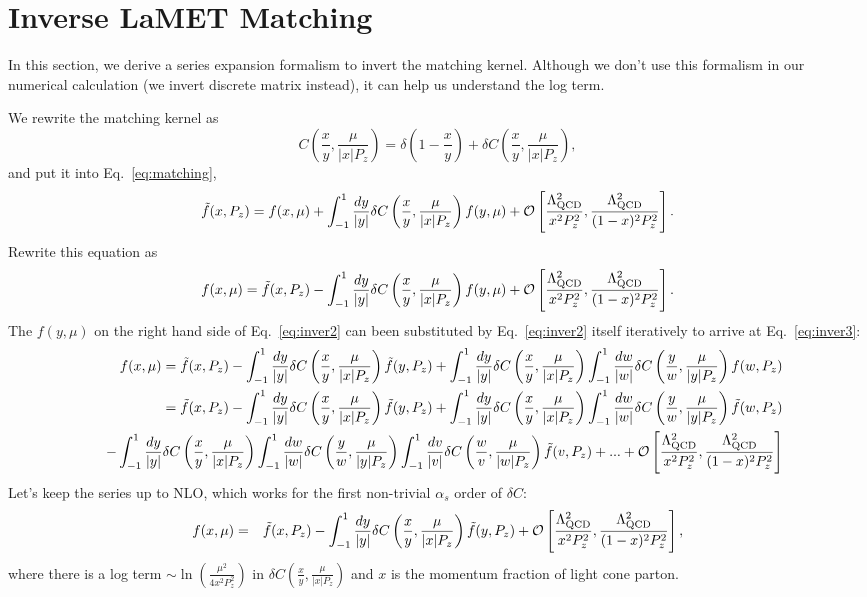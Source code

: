 \documentclass[prd,aps,twocolumn,preprintnumbers, showpacs, nofootinbib,superscriptaddress,notitlepage]{revtex4-2}
\def\bea{\begin{eqnarray}}
\def\eea{\end{eqnarray}}
\begin{document}
\section{Inverse LaMET Matching}\label{app:inversematching}

In this section, we derive a series expansion formalism to invert the matching kernel. Although we don't use this formalism in our numerical calculation (we invert discrete matrix instead), it can help us understand the log term. 

We rewrite the matching kernel as 
$$
C\left(\frac{x}{y},\frac{\mu}{|x|P_{z}}\right)=\delta\left(1-\frac{x}{y}\right) + \delta C\left(\frac{x}{y},\frac{\mu}{|x|P_{z}}\right),
$$ 
and put it into Eq.~\eqref{eq:matching},
\bea
\tilde{f}(x, P_{z}) = f(x, \mu) + \int_{-1}^{1} \frac{dy}{\left| y \right|} \delta C\left(\frac{x}{y},\frac{\mu}{|x|P_{z}}\right) f(y, \mu) + {\cal O}\left[\frac{\Lambda_{\rm QCD}^2}{x^2 P_{z}^2}, \frac{\Lambda_{\rm QCD}^2}{(1-x)^2 P_{z}^2}\right].
\eea
Rewrite this equation as
\bea\label{eq:inver2}
f(x, \mu) = \tilde{f}(x, P_{z}) - \int_{-1}^{1} \frac{dy}{\left| y \right|} \delta C\left(\frac{x}{y},\frac{\mu}{|x|P_{z}}\right) f(y, \mu) + {\cal O}\left[\frac{\Lambda_{\rm QCD}^2}{x^2 P_{z}^2}, \frac{\Lambda_{\rm QCD}^2}{(1-x)^2 P_{z}^2}\right].
\eea
The $f(y, \mu)$ on the right hand side of Eq.~\eqref{eq:inver2} can been substituted by Eq.~\eqref{eq:inver2} itself iteratively to arrive at Eq.~\eqref{eq:inver3}:
\bea\label{eq:inver3}
&&f(x, \mu) = \tilde{f}(x, P_{z}) - \int_{-1}^{1} \frac{dy}{\left| y \right|} \delta C\left(\frac{x}{y},\frac{\mu}{|x|P_{z}}\right) \tilde{f}(y, P_{z}) 
+ \int_{-1}^{1} \frac{dy}{\left| y \right|} \delta C\left(\frac{x}{y},\frac{\mu}{|x|P_{z}}\right) \int_{-1}^{1} \frac{dw}{\left| w \right|} \delta C\left(\frac{y}{w},\frac{\mu}{|y|P_{z}}\right) f(w, P_{z}) \nonumber\\
&&= \tilde{f}(x, P_{z}) - \int_{-1}^{1} \frac{dy}{\left| y \right|} \delta C\left(\frac{x}{y},\frac{\mu}{|x|P_{z}}\right) \tilde{f}(y, P_{z}) 
+ \int_{-1}^{1} \frac{dy}{\left| y \right|} \delta C\left(\frac{x}{y},\frac{\mu}{|x|P_{z}}\right) \int_{-1}^{1} \frac{dw}{\left| w \right|} \delta C\left(\frac{y}{w},\frac{\mu}{|y|P_{z}}\right) \tilde{f}(w, P_{z}) \nonumber\\
&&-\int_{-1}^{1} \frac{dy}{\left| y \right|} \delta C\left(\frac{x}{y},\frac{\mu}{|x|P_{z}}\right) \int_{-1}^{1} \frac{dw}{\left| w \right|} \delta C\left(\frac{y}{w},\frac{\mu}{|y|P_{z}}\right) \int_{-1}^{1} \frac{dv}{\left| v \right|} \delta C\left(\frac{w}{v},\frac{\mu}{|w|P_{z}}\right) \tilde{f}(v, P_{z}) + ... + {\cal O}\left[\frac{\Lambda_{\rm QCD}^2}{x^2 P_{z}^2}, \frac{\Lambda_{\rm QCD}^2}{(1-x)^2 P_{z}^2}\right]
\eea
Let's keep the series up to NLO, which works for the first non-trivial $\alpha_s$ order of $\delta C$:
\bea
f(x, \mu) 
=&& \tilde{f}(x, P_{z}) - \int_{-1}^{1} \frac{dy}{\left| y \right|} \delta C\left(\frac{x}{y},\frac{\mu}{|x|P_{z}}\right) \tilde{f}(y, P_{z}) + {\cal O}\left[\frac{\Lambda_{\rm QCD}^2}{x^2 P_{z}^2}, \frac{\Lambda_{\rm QCD}^2}{(1-x)^2 P_{z}^2}\right],
\eea
where there is a log term $\sim \ln \left(\frac{\mu^2}{4 x^2 P_z^2} \right)$ in $\delta C\left(\frac{x}{y},\frac{\mu}{|x|P_{z}}\right)$ and $x$ is the momentum fraction of light cone parton.
\end{document}
